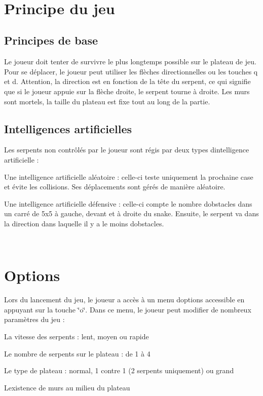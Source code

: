 ~\newline
 \hypertarget{index_jeu}{}\section{Principe du jeu}\label{index_jeu}
\hypertarget{index_jeu_base}{}\subsection{Principes de base}\label{index_jeu_base}
Le joueur doit tenter de survivre le plus longtemps possible sur le plateau de jeu. Pour se déplacer, le joueur peut utiliser les flèches directionnelles ou les touches q et d. Attention, la direction est en fonction de la tête du serpent, ce qui signifie que si le joueur appuie sur la flèche droite, le serpent tourne à droite. Les murs sont mortels, la taille du plateau est fixe tout au long de la partie.\hypertarget{index_jeu_ia}{}\subsection{Intelligences artificielles}\label{index_jeu_ia}
Les serpents non contrôlés par le joueur sont régis par deux types d\textquotesingle{}intelligence artificielle \+:
\begin{DoxyItemize}
\item Une intelligence artificielle aléatoire \+: celle-\/ci teste uniquement la prochaine case et évite les collisions. Ses déplacements sont gérés de manière aléatoire.
\item Une intelligence artificielle défensive \+: celle-\/ci compte le nombre d\textquotesingle{}obstacles dans un carré de 5x5 à gauche, devant et à droite du snake. Ensuite, le serpent va dans la direction dans laquelle il y a le moins d\textquotesingle{}obstacles.
\end{DoxyItemize}

~\newline
 \hypertarget{index_options}{}\section{Options}\label{index_options}
Lors du lancement du jeu, le joueur a accès à un menu d\textquotesingle{}options accessible en appuyant sur la touche \char`\"{}o\char`\"{}. Dans ce menu, le joueur peut modifier de nombreux paramètres du jeu \+:
\begin{DoxyItemize}
\item La vitesse des serpents \+: lent, moyen ou rapide
\item Le nombre de serpents sur le plateau \+: de 1 à 4
\item Le type de plateau \+: normal, 1 contre 1 (2 serpents uniquement) ou grand
\item L\textquotesingle{}existence de murs au milieu du plateau 
\end{DoxyItemize}